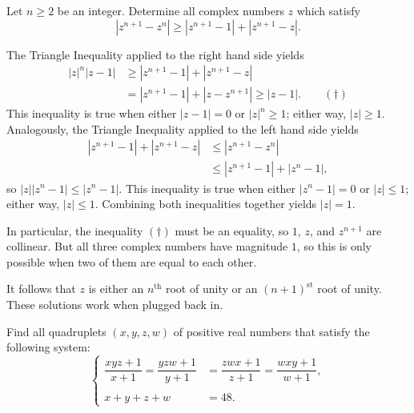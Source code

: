 \documentclass[11pt]{article}
\theoremstyle{definition}
\begin{document}
%	



\begin{question}[name={2023 Romanian District Olympiad, \href{https://artofproblemsolving.com/community/c6h3029964p27258241}{Problem 10.3}}]
	Let $n\geqslant 2$ be an integer. Determine all complex numbers $z{}$ which satisfy\[|z^{n+1}-z^n|\geqslant|z^{n+1}-1|+|z^{n+1}-z|.\]
\end{question}

\begin{solution}[name={Solution by David Altizio}]
	The Triangle Inequality applied to the right hand side yields
	\begin{align*}
		|z|^n|z-1| &\geqslant |z^{n+1} - 1| + |z^{n+1} - z| \\
		&= |z^{n+1} - 1| + |z - z^{n+1}| \geqslant |z - 1|.\qquad(\dagger)
	\end{align*}This inequality is true when either $|z - 1| = 0$ or $|z|^n \geqslant 1$; either way, $|z| \geqslant 1$. Analogously, the Triangle Inequality applied to the left hand side yields
	\begin{align*}
		|z^{n+1} - 1| + |z^{n+1} - z| &\leqslant |z^{n+1} - z^n| \\
		&\leqslant |z^{n+1} - 1| + |z^n - 1|,
	\end{align*}so $|z| |z^n - 1| \leqslant |z^n - 1|$. This inequality is true when either $|z^n - 1| = 0$ or $|z| \leqslant 1$; either way, $|z| \leqslant 1$. Combining both inequalities together yields $|z| = 1$.
	
	In particular, the inequality $(\dagger)$ must be an equality, so $1$, $z$, and $z^{n+1}$ are collinear. But all three complex numbers have magnitude $1$, so this is only possible when two of them are equal to each other.
	
	It follows that $z$ is either an $n^{\text{th}}$ root of unity or an $(n+1)^{\text{st}}$ root of unity. These solutions work when plugged back in.
\end{solution}


\begin{question}[name={2023 Greece National Olympiad, \href{https://artofproblemsolving.com/community/c6h3017817p27118997}{Problem 1}}]
	Find all quadruplets $(x, y, z, w)$ of positive real numbers that satisfy the following system:
	$$\begin{cases}
		\dfrac{xyz+1}{x+1}= \dfrac{yzw+1}{y+1} &= \dfrac{zwx+1}{z+1}= \dfrac{wxy+1}{w+1},\\
		&\\
		x+y+z+w &= 48.
	\end{cases}$$
\end{question}
\end{document}
